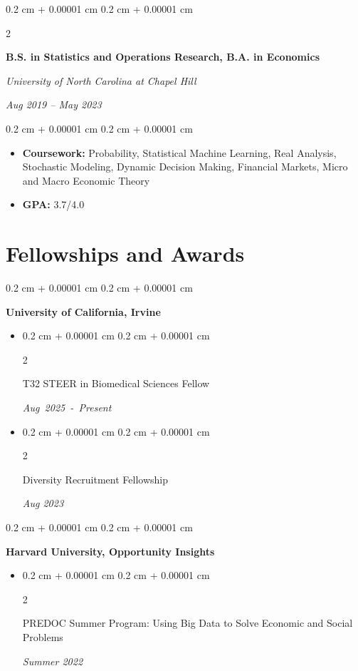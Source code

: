 \documentclass[10pt, letterpaper]{article}
\newenvironment{highlights}{
    \begin{itemize}[
        topsep=0.10 cm,
        parsep=0.10 cm,
        partopsep=0pt,
        itemsep=0pt,
        leftmargin=0.4 cm + 10pt
    ]
}{
    \end{itemize}
} %
\newenvironment{onecolentry}{
    \begin{adjustwidth}{
        0.2 cm + 0.00001 cm
    }{
        0.2 cm + 0.00001 cm
    }
}{
    \end{adjustwidth}
} %
\newenvironment{twocolentry}[2][]{
    \onecolentry
    \def\secondColumn{#2}
    \setcolumnwidth{\fill, 4.5 cm}
    \begin{paracol}{2}
}{
    \switchcolumn \raggedleft \secondColumn
    \end{paracol}
    \endonecolentry
} %
\begin{document}
        \vspace{0.10 cm}
        
        \begin{twocolentry}{
        \textit{Aug 2019 – May 2023}}
            \textbf{B.S. in Statistics and Operations Research, B.A. in Economics}

            \textit{University of North Carolina at Chapel Hill}
        \end{twocolentry}
        
        \vspace{0.10 cm}
        \begin{onecolentry}
            \begin{highlights}
                \item \textbf{Coursework:} 
                Probability, Statistical Machine Learning, Real Analysis, Stochastic Modeling, Dynamic Decision Making, Financial Markets, Micro and Macro Economic Theory
                \item \textbf{GPA:} 3.7/4.0 
            \end{highlights}
            
        \end{onecolentry}

        \vspace{-0.0cm}

\section{Fellowships and Awards}
    \begin{onecolentry}
        \textbf{University of California, Irvine}
        \begin{highlights}
            \item \begin{twocolentry}{\textit{Aug~2025~-~Present}}
                    T32 STEER in Biomedical Sciences Fellow
                  \end{twocolentry}
            \item \begin{twocolentry}{\textit{Aug 2023}}
                    Diversity Recruitment Fellowship
                  \end{twocolentry}
        \end{highlights}
    \end{onecolentry}
    \vspace{0.10 cm}
    \begin{onecolentry}
        \textbf{Harvard University, Opportunity Insights}
        \begin{highlights}
            \item \begin{twocolentry}{\textit{Summer 2022}}
                    PREDOC Summer Program: Using Big Data to Solve Economic and Social Problems
                  \end{twocolentry}
        \end{highlights}
    \end{onecolentry}
\end{document}
